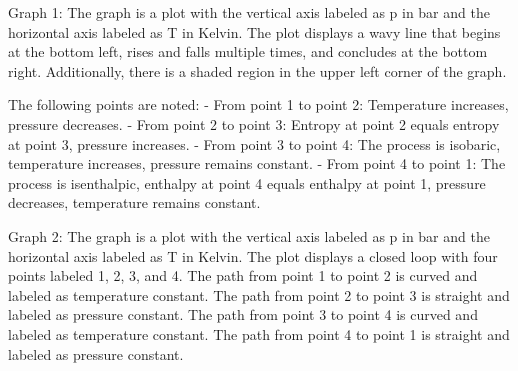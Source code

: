 Graph 1: The graph is a plot with the vertical axis labeled as p in bar and the horizontal axis labeled as T in Kelvin. The plot displays a wavy line that begins at the bottom left, rises and falls multiple times, and concludes at the bottom right. Additionally, there is a shaded region in the upper left corner of the graph.

The following points are noted:
- From point 1 to point 2: Temperature increases, pressure decreases.
- From point 2 to point 3: Entropy at point 2 equals entropy at point 3, pressure increases.
- From point 3 to point 4: The process is isobaric, temperature increases, pressure remains constant.
- From point 4 to point 1: The process is isenthalpic, enthalpy at point 4 equals enthalpy at point 1, pressure decreases, temperature remains constant.

Graph 2: The graph is a plot with the vertical axis labeled as p in bar and the horizontal axis labeled as T in Kelvin. The plot displays a closed loop with four points labeled 1, 2, 3, and 4. The path from point 1 to point 2 is curved and labeled as temperature constant. The path from point 2 to point 3 is straight and labeled as pressure constant. The path from point 3 to point 4 is curved and labeled as temperature constant. The path from point 4 to point 1 is straight and labeled as pressure constant.